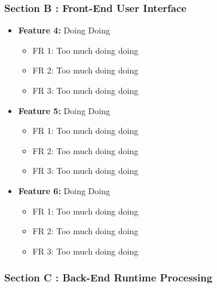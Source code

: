 \documentclass[11pt,]{article}
\providecommand{\tightlist}{%
  \setlength{\itemsep}{0pt}\setlength{\parskip}{0pt}}
\begin{document}
\hypertarget{section-b-front-end-user-interface}{%
\subsubsection{Section B : Front-End User
Interface}\label{section-b-front-end-user-interface}}

\begin{itemize}
\tightlist
\item
  \textbf{Feature 4:} Doing Doing

  \begin{itemize}
  \tightlist
  \item
    FR 1: Too much doing doing
  \item
    FR 2: Too much doing doing
  \item
    FR 3: Too much doing doing
  \end{itemize}
\item
  \textbf{Feature 5:} Doing Doing

  \begin{itemize}
  \tightlist
  \item
    FR 1: Too much doing doing
  \item
    FR 2: Too much doing doing
  \item
    FR 3: Too much doing doing
  \end{itemize}
\item
  \textbf{Feature 6:} Doing Doing

  \begin{itemize}
  \tightlist
  \item
    FR 1: Too much doing doing
  \item
    FR 2: Too much doing doing
  \item
    FR 3: Too much doing doing
  \end{itemize}
\end{itemize}

\hypertarget{section-c-back-end-runtime-processing}{%
\subsubsection{Section C : Back-End Runtime
Processing}\label{section-c-back-end-runtime-processing}}
\end{document}
